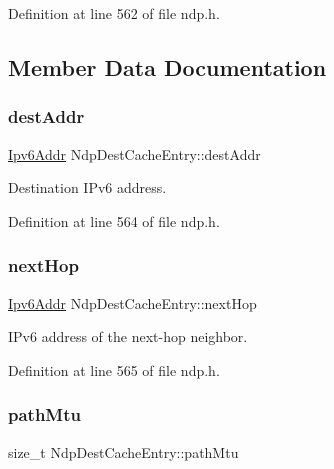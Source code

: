 Definition at line 562 of file ndp.\+h.



\subsection{Member Data Documentation}
\mbox{\label{structNdpDestCacheEntry_a7ae9c14d0f1debbf7e5a756d4edb20ff}} 
\subsubsection{\texorpdfstring{dest\+Addr}{destAddr}}
{\footnotesize\ttfamily \hyperlink{ipv6_8h_aed0cbc40c61ed5b4fb681ebc55237e89}{Ipv6\+Addr} Ndp\+Dest\+Cache\+Entry\+::dest\+Addr}



Destination I\+Pv6 address. 



Definition at line 564 of file ndp.\+h.

\mbox{\label{structNdpDestCacheEntry_ad4faeec940b627f2b0c73d298fb2e605}} 
\subsubsection{\texorpdfstring{next\+Hop}{nextHop}}
{\footnotesize\ttfamily \hyperlink{ipv6_8h_aed0cbc40c61ed5b4fb681ebc55237e89}{Ipv6\+Addr} Ndp\+Dest\+Cache\+Entry\+::next\+Hop}



I\+Pv6 address of the next-\/hop neighbor. 



Definition at line 565 of file ndp.\+h.

\mbox{\label{structNdpDestCacheEntry_aa9f02a7bf3d1a681861c8affd54e0354}} 
\subsubsection{\texorpdfstring{path\+Mtu}{pathMtu}}
{\footnotesize\ttfamily size\+\_\+t Ndp\+Dest\+Cache\+Entry\+::path\+Mtu}



